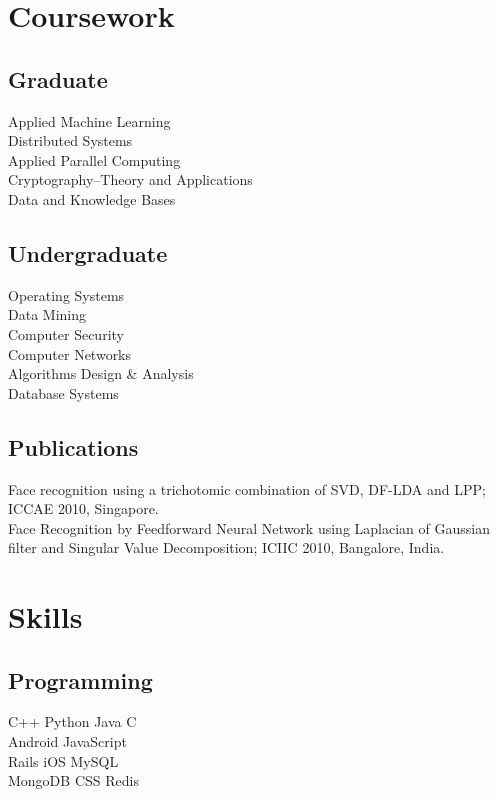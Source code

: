 \documentclass[]{deedy-resume-openfont}
\begin{document}
\begin{minipage}[t]{0.35\textwidth}

\section{Coursework}
\subsection{Graduate}
Applied Machine Learning \\
Distributed Systems \\
Applied Parallel Computing \\
Cryptography–Theory and Applications \\
Data and Knowledge Bases \\
\sectionsep

\subsection{Undergraduate}
Operating Systems \\
Data Mining \\
Computer Security\\
Computer Networks\\
Algorithms Design \& Analysis\\
Database Systems\\
\sectionsep

\subsection{Publications}
{\fontsize{9}{11}\selectfont
Face
recognition
using
a
trichotomic
combination
of
SVD,
DF-LDA
and
LPP;
ICCAE
2010,
Singapore. \\
Face
Recognition
by
Feedforward
Neural
Network
using
Laplacian
of
Gaussian
filter
and
Singular
Value
Decomposition;
ICIIC
2010,
Bangalore,
India.
}
\sectionsep


\section{Skills}
\subsection{Programming}

\textbullet{} C++
\textbullet{} Python
\textbullet{} Java     \textbullet{} C \\
\textbullet{} Android \textbullet{} JavaScript \\
\textbullet{}Rails \textbullet{} iOS  \textbullet{} MySQL \\ \textbullet{} MongoDB\textbullet{} CSS \textbullet{}Redis
\sectionsep


%
%

\end{minipage} 
\end{document}
